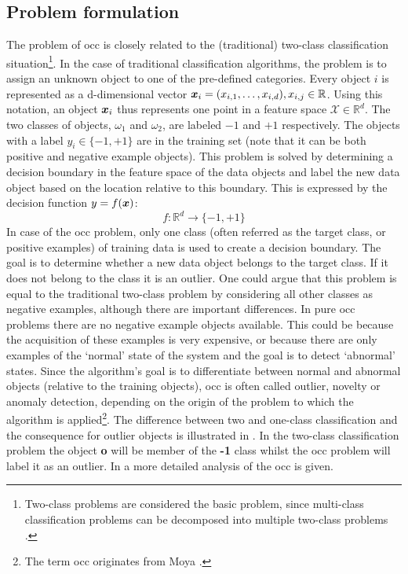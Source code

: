 \subsection{Problem formulation}\label{subsec:occ-problem-formulation}
The problem of \acrlong{occ} is closely related to the (traditional) two-class classification situation\footnote{Two-class problems are considered the basic problem, since multi-class classification problems can be decomposed into multiple two-class problems \cite{fukunaga1990introduction}.}.
In the case of traditional classification algorithms, the problem is to assign an unknown object to one of the pre-defined categories.
Every object $i$ is represented as a d-dimensional vector $\vectorsym{x}_i = (x_{i,1},\dots,x_{i,d}), x_{i,j} \in \mathbb{R}$.
Using this notation, an object $\vectorsym{x}_i$ thus represents one point in a feature space $\mathcal{X} \in \mathbb{R}^d$.
The two classes of objects, $\omega_1$ and $\omega_2$, are labeled $-1$ and $+1$ respectively.
The objects with a label $y_i \in \{-1, +1\}$ are in the training set (note that it can be both positive and negative example objects).
This problem is solved by determining a decision boundary in the feature space of the data objects and label the new data object based on the location relative to this boundary.
This is expressed by the decision function $y = f(\vectorsym{x})$:
\begin{equation}\label{eq:decision_function_classification}
  f: \mathbb{R}^d \rightarrow \{-1, +1\}
\end{equation}
In case of the \gls{occ} problem, only one class (often referred as the target class, or positive examples) of training data is used to create a decision boundary.
The goal is to determine whether a new data object belongs to the target class.
If it does not belong to the class it is an outlier.
One could argue that this problem is equal to the traditional two-class problem by considering all other classes as negative examples, although there are important differences.
In pure \gls{occ} problems there are no negative example objects available.
This could be because the acquisition of these examples is very expensive, or because there are only examples of the `normal' state of the system and the goal is to detect `abnormal' states.
Since the algorithm's goal is to differentiate between normal and abnormal objects (relative to the training objects), \gls{occ} is often called outlier, novelty or anomaly detection, depending on the origin of the problem to which the algorithm is applied\footnote{The term \acrlong{occ} originates from Moya \etal \cite{moya1993one}.}.
The difference between two and one-class classification and the consequence for outlier objects is illustrated in .
In the two-class classification problem the object \textbf{o} will be member of the \textbf{-1} class whilst the \gls{occ} problem will label it as an outlier.
In \cite{tax2001one} a more detailed analysis of the \gls{occ} is given.

